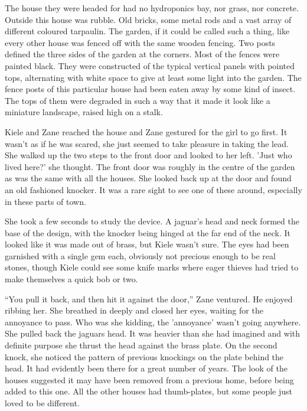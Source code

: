 The house they were headed for had no hydroponics bay, nor grass, nor concrete.  Outside this house was rubble.  Old bricks, some metal rods and a vast array of different coloured tarpaulin.  The garden, if it could be called such a thing, like every other house was fenced off with the same wooden fencing.  Two posts defined the three sides of the garden at the corners.  Most of the fences were painted black.  They were constructed of the typical vertical panels with pointed tops, alternating with white space to give at least some light into the garden.  The fence posts of this particular house had been eaten away by some kind of insect.  The tops of them were degraded in such a way that it made it look like a miniature landscape, raised high on a stalk.

Kiele and Zane reached the house and Zane gestured for the girl to go first.  It wasn't as if he was scared, she just seemed to take pleasure in taking the lead.  She walked up the two steps to the front door and looked to her left.  'Just who lived here?' she thought.  The front door was roughly in the centre of the garden as was the same with all the houses.  She looked back up at the door and found an old fashioned knocker.  It was a rare sight to see one of these around, especially in these parts of town.

She took a few seconds to study the device.  A jaguar's head and neck formed the base of the design, with the knocker being hinged at the far end of the neck.  It looked like it was made out of brass, but Kiele wasn't sure.  The eyes had been garnished with a single gem each, obviously not precious enough to be real stones, though Kiele could see some knife marks where eager thieves had tried to make themselves a quick bob or two.

``You pull it back, and then hit it against the door,'' Zane ventured.  He enjoyed ribbing her.  She breathed in deeply and closed her eyes, waiting for the annoyance to pass.  Who was she kidding, the 'annoyance' wasn't going anywhere.  She pulled back the jaguars head.  It was heavier than she had imagined and with definite purpose she thrust the head against the brass plate.  On the second knock, she noticed the pattern of previous knockings on the plate behind the head.  It had evidently been there for a great number of years.  The look of the houses suggested it may have been removed from a previous home, before being added to this one.  All the other houses had thumb-plates, but some people just loved to be different.

